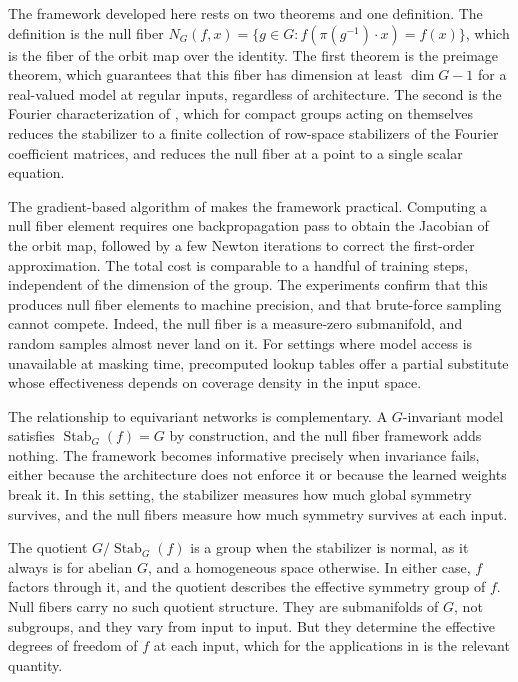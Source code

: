 \documentclass[11pt]{article}
\DeclareMathOperator{\Stab}{Stab}
\begin{document}
The framework developed here rests on two theorems and one definition. The definition is the null fiber $N_G(f, x) = \{g \in G : f(\pi(g^{-1}) \cdot x) = f(x)\}$, which is the fiber of the orbit map over the identity. The first theorem is the preimage theorem, which guarantees that this fiber has dimension at least $\dim G - 1$ for a real-valued model at regular inputs, regardless of architecture. The second is the Fourier characterization of , which for compact groups acting on themselves reduces the stabilizer to a finite collection of row-space stabilizers of the Fourier coefficient matrices, and reduces the null fiber at a point to a single scalar equation.

The gradient-based algorithm of  makes the framework practical. Computing a null fiber element requires one backpropagation pass to obtain the Jacobian of the orbit map, followed by a few Newton iterations to correct the first-order approximation. The total cost is comparable to a handful of training steps, independent of the dimension of the group. The experiments confirm that this produces null fiber elements to machine precision, and that brute-force sampling cannot compete. Indeed, the null fiber is a measure-zero submanifold, and random samples almost never land on it. For settings where model access is unavailable at masking time, precomputed lookup tables offer a partial substitute whose effectiveness depends on coverage density in the input space.

The relationship to equivariant networks is complementary. A $G$-invariant model satisfies $\Stab_G(f) = G$ by construction, and the null fiber framework adds nothing. The framework becomes informative precisely when invariance fails, either because the architecture does not enforce it or because the learned weights break it. In this setting, the stabilizer measures how much global symmetry survives, and the null fibers measure how much symmetry survives at each input.

The quotient $G / \Stab_G(f)$ is a group when the stabilizer is normal, as it always is for abelian $G$, and a homogeneous space otherwise. In either case, $f$ factors through it, and the quotient describes the effective symmetry group of $f$. Null fibers carry no such quotient structure. They are submanifolds of $G$, not subgroups, and they vary from input to input. But they determine the effective degrees of freedom of $f$ at each input, which for the applications in  is the relevant quantity.
\end{document}
